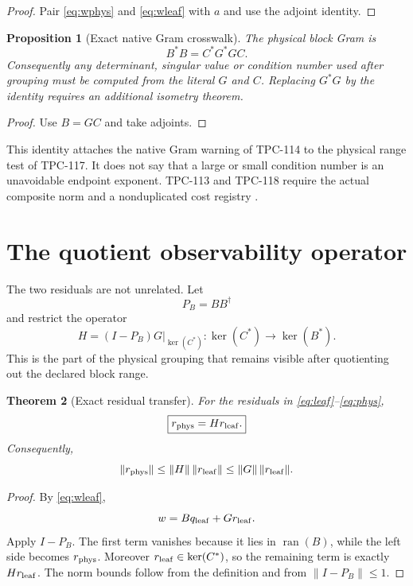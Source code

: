 \documentclass[11pt]{article}
\newtheorem{theorem}{Theorem}[section]
\newtheorem{proposition}[theorem]{Proposition}
\theoremstyle{definition}
\theoremstyle{remark}
\newcommand{\Ran}{\operatorname{ran}}
\newcommand{\Ker}{\operatorname{ker}}
\begin{document}
\begin{proof}
Pair \eqref{eq:wphys} and \eqref{eq:wleaf} with \(a\) and use the
adjoint identity.
\end{proof}

\begin{proposition}[Exact native Gram crosswalk]
\label{prop:gram}
The physical block Gram is
\[
 \boxed{B^*B=C^*G^*GC.}
\]
Consequently any determinant, singular value or condition number
used after grouping must be computed from the literal \(G\) and
\(C\).  Replacing \(G^*G\) by the identity requires an additional
isometry theorem.
\end{proposition}

\begin{proof}
Use \(B=GC\) and take adjoints.
\end{proof}

This identity attaches the native Gram warning of TPC-114 to the
physical range test of TPC-117.  It does not say that a large or small
condition number is an unavoidable endpoint exponent.  TPC-113 and
TPC-118 require the actual composite norm and a nonduplicated cost
registry \citep{WangTPC113,WangTPC118}.

\section{The quotient observability operator}

The two residuals are not unrelated.  Let
\[
 P_B=BB^\dagger
\]
and restrict the operator
\[
 H=(I-P_B)G\big|_{\Ker(C^*)}:
 \Ker(C^*)\longrightarrow\Ker(B^*).
\]
This is the part of the physical grouping that remains visible after
quotienting out the declared block range.

\begin{theorem}[Exact residual transfer]
\label{thm:residual-transfer}
For the residuals in \eqref{eq:leaf}--\eqref{eq:phys},
\begin{equation}
 \boxed{r_{\rm phys}=Hr_{\rm leaf}.}
 \label{eq:residual-transfer}
\end{equation}
Consequently,
\[
 \|r_{\rm phys}\|
 \le
 \|H\|\,\|r_{\rm leaf}\|
 \le
 \|G\|\,\|r_{\rm leaf}\|.
\]
\end{theorem}

\begin{proof}
By \eqref{eq:wleaf},
\[
 w=Bq_{\rm leaf}+Gr_{\rm leaf}.
\]
Apply \(I-P_B\).  The first term vanishes because it lies in
\(\Ran(B)\), while the left side becomes \(r_{\rm phys}\).
Moreover \(r_{\rm leaf}\in\Ker(C^*)\), so the remaining term is
exactly \(Hr_{\rm leaf}\).  The norm bounds follow from the
definition and from \(\|I-P_B\|\le1\).
\end{proof}
\end{document}

